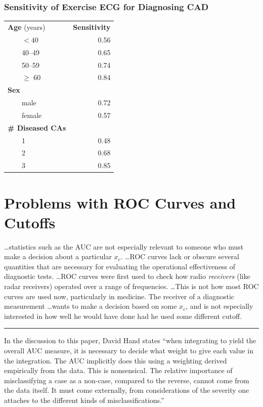 \subsubsection{Sensitivity of Exercise ECG for Diagnosing CAD}
\begin{center}\smaller
\begin{tabular}{lr} \hline
\textbf{Age} (years) & \textbf{Sensitivity} \\
~~~~$<40$ & 0.56 \\
~~~~40--49& 0.65 \\
~~~~50--59 & 0.74 \\
~~~~$\geq$ 60 & 0.84 \\ \hline
\textbf{Sex} & \\
~~~~male & 0.72 \\
~~~~female & 0.57 \\ \hline
\textbf{\# Diseased CAs} & \\
~~~~1 & 0.48 \\
~~~~2 & 0.68 \\
~~~~3 & 0.85 \\ \hline
\end{tabular}\end{center}
\citet{hla84fac}

\section{Problems with ROC Curves and Cutoffs}
{\smaller \ldots statistics such as the AUC are not especially relevant to someone who
must make a decision about a particular $x_{c}$.  \ldots ROC curves
lack or obscure several quantities that are necessary for evaluating
the operational effectiveness of diagnostic tests. \ldots ROC curves
were first used to check how radio \emph{receivers} (like radar
receivers) operated over a range of frequencies. \ldots This is not
how most ROC curves are used now, particularly in medicine.  The
receiver of a diagnostic measurement \ldots wants to make a decision
based on some $x_{c}$, and is not especially interested in how well he
would have done had he used some different cutoff.~\citet{bri08ski}
\\[1ex]
\hrule
In the discussion to this paper, David Hand
states ``when integrating to yield the overall 
AUC measure, it is necessary to decide what weight to give each value
in the integration.  The AUC implicitly does this using a weighting
derived empirically from the data.  This is nonsensical.  The relative 
importance of misclassifying a case as a non-case, compared to the
reverse, cannot come from the data itself.  It must come externally,
from considerations of the severity one attaches to the different
kinds of misclassifications.''}


